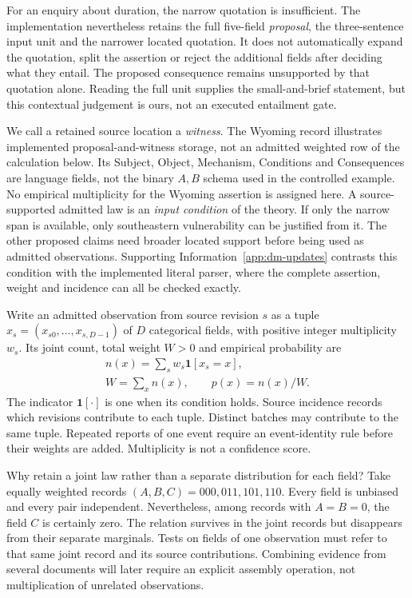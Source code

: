 \documentclass[reprint,aps,prx,superscriptaddress,nofootinbib,longbibliography]{revtex4-2}
\begin{document}
For an enquiry about duration, the narrow quotation is insufficient.
The implementation nevertheless retains the full five-field \emph{proposal}, the three-sentence input unit and the narrower located quotation.
It does not automatically expand the quotation, split the assertion or reject the additional fields after deciding what they entail.
The proposed consequence remains unsupported by that quotation alone.
Reading the full unit supplies the small-and-brief statement, but this contextual judgement is ours, not an executed entailment gate.

We call a retained source location a \emph{witness}.
The Wyoming record illustrates implemented proposal-and-witness storage, not an admitted weighted row of the calculation below.
Its Subject, Object, Mechanism, Conditions and Consequences are language fields, not the binary \(A,B\) schema used in the controlled example.
No empirical multiplicity for the Wyoming assertion is assigned here.
A source-supported admitted law is an \emph{input condition} of the theory.
If only the narrow span is available, only southeastern vulnerability can be justified from it.
The other proposed claims need broader located support before being used as admitted observations.
Supporting Information~\ref{app:dm-updates} contrasts this condition with the implemented literal parser, where the complete assertion, weight and incidence can all be checked exactly.

Write an admitted observation from source revision \(s\) as a tuple
\(x_s=(x_{s0},\ldots,x_{s,D-1})\) of \(D\) categorical fields, with positive integer multiplicity \(w_s\).
Its joint count, total weight \(W>0\) and empirical probability are
\begin{equation}
 \begin{gathered}
 n(x)=\sum_s w_s\mathbf1[x_s=x],\\
 W=\sum_xn(x),\qquad p(x)=n(x)/W .
 \end{gathered}
 \label{eq:joint-counts}
\end{equation}
The indicator \(\mathbf1[\cdot]\) is one when its condition holds.
Source incidence records which revisions contribute to each tuple.
Distinct batches may contribute to the same tuple.
Repeated reports of one event require an event-identity rule before their weights are added.
Multiplicity is not a confidence score.

Why retain a joint law rather than a separate distribution for each field?
Take equally weighted records \((A,B,C)=000,011,101,110\).
Every field is unbiased and every pair independent.
Nevertheless, among records with \(A=B=0\), the field \(C\) is certainly zero.
The relation survives in the joint records but disappears from their separate marginals.
Tests on fields of one observation must refer to that same joint record and its source contributions.
Combining evidence from several documents will later require an explicit assembly operation, not multiplication of unrelated observations.
\end{document}
